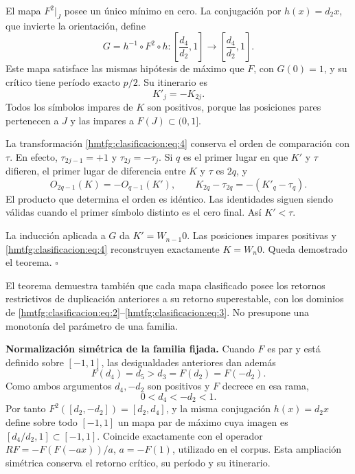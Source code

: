 El mapa \(F^2|_J\) posee un único mínimo en cero. La conjugación por \(h(x)=d_2x\), que invierte la orientación, define
\begin{equation}
G=h^{-1}\circ F^2\circ h:
\left[\frac{d_4}{d_2},1\right]\longrightarrow
\left[\frac{d_4}{d_2},1\right].
\label{hmtfg:clasificacion:eq:3}
\end{equation}
Este mapa satisface las mismas hipótesis de máximo que \(F\), con \(G(0)=1\), y su crítico tiene período exacto \(p/2\). Su itinerario es
\begin{equation}
K'_j=-K_{2j}.
\label{hmtfg:clasificacion:eq:4}
\end{equation}
Todos los símbolos impares de \(K\) son positivos, porque las posiciones pares pertenecen a \(J\) y las impares a \(F(J)\subset(0,1]\).

La transformación \eqref{hmtfg:clasificacion:eq:4} conserva el orden de comparación con \(\tau\). En efecto, \(\tau_{2j-1}=+1\) y \(\tau_{2j}=-\tau_j\). Si \(q\) es el primer lugar en que \(K'\) y \(\tau\) difieren, el primer lugar de diferencia entre \(K\) y \(\tau\) es \(2q\), y
\begin{equation}
O_{2q-1}(K)=-O_{q-1}(K'),
\qquad K_{2q}-\tau_{2q}=-(K'_q-\tau_q).
\label{hmtfg:clasificacion:eq:5}
\end{equation}
El producto que determina el orden es idéntico. Las identidades siguen siendo válidas cuando el primer símbolo distinto es el cero final. Así \(K'<\tau\).

La inducción aplicada a \(G\) da \(K'=W_{n-1}0\). Las posiciones impares positivas y \eqref{hmtfg:clasificacion:eq:4} reconstruyen exactamente \(K=W_n0\). Queda demostrado el teorema. \(\square\)

El teorema demuestra también que cada mapa clasificado posee los retornos restrictivos de duplicación anteriores a su retorno superestable, con los dominios de \eqref{hmtfg:clasificacion:eq:2}–\eqref{hmtfg:clasificacion:eq:3}. No presupone una monotonía del parámetro de una familia.

\textbf{Normalización simétrica de la familia fijada.} Cuando \(F\) es par y está definido sobre \([-1,1]\), las desigualdades anteriores dan además
\[
F(d_4)=d_5>d_3=F(d_2)=F(-d_2).
\]
Como ambos argumentos \(d_4,-d_2\) son positivos y \(F\) decrece en esa rama,
\begin{equation}
0<d_4<-d_2<1.
\label{hmtfg:clasificacion:eq:5a}
\end{equation}
Por tanto \(F^2([d_2,-d_2])=[d_2,d_4]\), y la misma conjugación \(h(x)=d_2x\) define sobre todo \([-1,1]\) un mapa par de máximo cuya imagen es \([d_4/d_2,1]\subset[-1,1]\). Coincide exactamente con el operador \(RF=-F(F(-ax))/a\), \(a=-F(1)\), utilizado en el corpus. Esta ampliación simétrica conserva el retorno crítico, su período y su itinerario.


